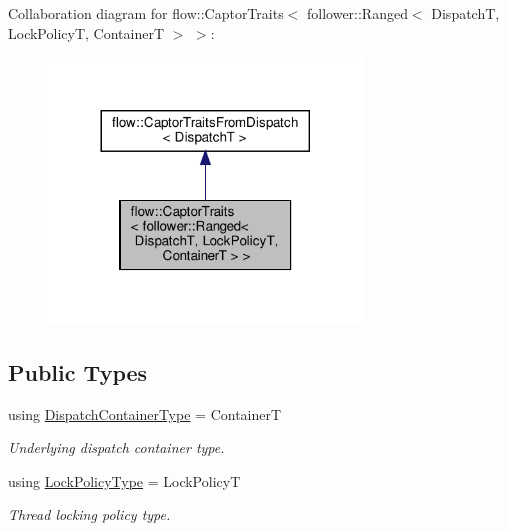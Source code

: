 Collaboration diagram for flow\+:\+:Captor\+Traits$<$ follower\+:\+:Ranged$<$ DispatchT, Lock\+PolicyT, ContainerT $>$ $>$\+:
\nopagebreak
\begin{figure}[H]
\begin{center}
\leavevmode
\includegraphics[width=236pt]{structflow_1_1_captor_traits_3_01follower_1_1_ranged_3_01_dispatch_t_00_01_lock_policy_t_00_01_c8938fb851c68c18c6b678c859df867e4}
\end{center}
\end{figure}
\subsection*{Public Types}
\begin{DoxyCompactItemize}
\item 
\mbox{\label{structflow_1_1_captor_traits_3_01follower_1_1_ranged_3_01_dispatch_t_00_01_lock_policy_t_00_01_container_t_01_4_01_4_abfc1dfc2cb82a557d3da71efe2fbae36}} 
using \hyperlink{structflow_1_1_captor_traits_3_01follower_1_1_ranged_3_01_dispatch_t_00_01_lock_policy_t_00_01_container_t_01_4_01_4_abfc1dfc2cb82a557d3da71efe2fbae36}{Dispatch\+Container\+Type} = ContainerT
\begin{DoxyCompactList}\small\item\em Underlying dispatch container type. \end{DoxyCompactList}\item 
\mbox{\label{structflow_1_1_captor_traits_3_01follower_1_1_ranged_3_01_dispatch_t_00_01_lock_policy_t_00_01_container_t_01_4_01_4_aee25c87c4cd32ded2ec65dd1a65d0ea2}} 
using \hyperlink{structflow_1_1_captor_traits_3_01follower_1_1_ranged_3_01_dispatch_t_00_01_lock_policy_t_00_01_container_t_01_4_01_4_aee25c87c4cd32ded2ec65dd1a65d0ea2}{Lock\+Policy\+Type} = Lock\+PolicyT
\begin{DoxyCompactList}\small\item\em Thread locking policy type. \end{DoxyCompactList}\end{DoxyCompactItemize}


